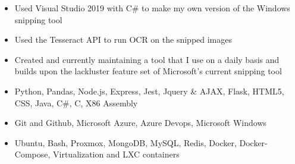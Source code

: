 \documentclass[10pt,a4paper,ragged2e]{altacv}
\begin{document}
\smallskip
\smallskip
{}
\begin{itemize}
\item Used Visual Studio 2019 with C\# to make my own version of the Windows snipping tool
\smallskip
\item Used the Tesseract API to run OCR on the snipped images
\smallskip
\item Created and currently maintaining a tool that I use on a daily basis and builds upon the lackluster feature set of Microsoft's current snipping tool
\end{itemize}
\smallskip
\smallskip
\smallskip
\smallskip
\smallskip
\smallskip
\smallskip
\smallskip
\smallskip
\smallskip
\smallskip
\smallskip
\smallskip
\smallskip


\vspace{.07in}

\smallskip
\begin{itemize}
\item Python, Pandas, Node.js, Express, Jest, Jquery \& AJAX, Flask, HTML5, CSS, Java, C\#, C, X86 Assembly
\smallskip
\item Git and Github, Microsoft Azure, Azure Devops, Microsoft Windows
\smallskip
\item Ubuntu, Bash, Proxmox, MongoDB, MySQL, Redis, Docker, Docker-Compose, Virtualization and LXC containers
\end{itemize}


\clearpage


\nocite{*}

\end{document}
